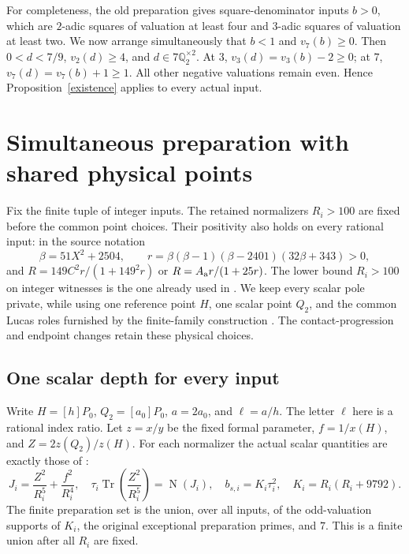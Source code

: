 \documentclass[11pt]{article}
\newcommand{\Q}{\mathbb Q}
\DeclareMathOperator{\Tr}{Tr}
\DeclareMathOperator{\Nm}{N}
\begin{document}
For completeness, the old preparation gives square-denominator
inputs $b>0$, which are $2$-adic squares of valuation at least four
and $3$-adic squares of valuation at least two. We now arrange
simultaneously that $b<1$ and $v_7(b)\ge0$. Then $0<d<7/9$,
$v_2(d)\ge4$, and $d\in7\Q_2^{\times2}$. At $3$,
$v_3(d)=v_3(b)-2\ge0$; at $7$, $v_7(d)=v_7(b)+1\ge1$.
All other negative valuations remain even. Hence
Proposition~\ref{existence} applies to every actual input.

\section{Simultaneous preparation with shared physical points}

Fix the finite tuple of integer inputs. The retained normalizers
$R_i>100$ are fixed before the common point choices. Their positivity
also holds on every rational input: in the source notation
\[
 \beta=51X^2+2504,\qquad
 r=\beta(\beta-1)(\beta-2401)(32\beta+343)>0,
\]
and $R=149C^2r/(1+149^2r)$ or $R=A_{\rm a}r/(1+25r)$.
The lower bound $R_i>100$ on integer witnesses is the one already
used in \cite{v82}. We keep every scalar pole private, while
using one reference point $H$, one scalar point $Q_2$, and the
common Lucas roles furnished by the finite-family construction
\cite{common,global}. The contact-progression and endpoint changes
\cite{progression,aggregate,v102,v103} retain these physical choices.

\subsection{One scalar depth for every input}

Write $H=[h]P_0$, $Q_2=[a_0]P_0$, $a=2a_0$, and
$\ell=a/h$. The letter $\ell$ here is a rational index ratio.
Let $z=x/y$ be the fixed formal parameter, $f=1/x(H)$, and
$Z=2z(Q_2)/z(H)$. For each normalizer the actual scalar quantities
are exactly those of \cite[Sections~2 and 7]{v82}:
\begin{equation}\label{scalar}
 J_i=\frac{Z^2}{R_i^5}+\frac{f^2}{R_i^4},\quad
 \tau_i\Tr\left(\frac{Z^2}{R_i^5}\right)=\Nm(J_i),\quad
 b_{s,i}=K_i\tau_i^2,\quad K_i=R_i(R_i+9792).
\end{equation}
The finite preparation set is the union, over all inputs, of the
odd-valuation supports of $K_i$, the original exceptional preparation
primes, and $7$. This is a finite union after all $R_i$ are fixed.
\end{document}
